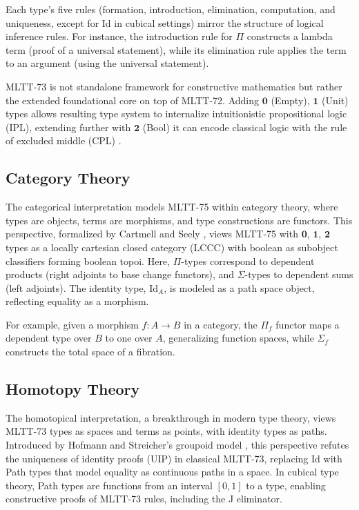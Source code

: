 \documentclass{article}
\begin{document}
Each type’s five rules (formation, introduction, elimination, computation,
and uniqueness, except for Id in cubical settings) mirror the structure
of logical inference rules. For instance, the introduction rule for $\Pi$
constructs a lambda term (proof of a universal statement), while its elimination
rule applies the term to an argument (using the universal statement).

MLTT-73 is not standalone framework for constructive mathematics
but rather the extended foundational core on top of MLTT-72.
Adding $\mathbf{0}$ (Empty), $\mathbf{1}$ (Unit) types allows
resulting type system to internalize intuitionistic propositional logic (IPL),
extending further with $\mathbf{2}$ (Bool) it can encode classical logic with
the rule of excluded middle (CPL) \cite{Nordstrom90}.

\subsection{Category Theory}

The categorical interpretation models MLTT-75 within category theory,
where types are objects, terms are morphisms, and type constructions are functors.
This perspective, formalized by Cartmell and Seely \cite{Jacobs99},
views MLTT-75 with $\mathbf{0}$, $\mathbf{1}$, $\mathbf{2}$ types
as a locally cartesian closed category (LCCC) with boolean as subobject classifiers forming boolean topoi.
Here, $\Pi$-types correspond to dependent products (right adjoints to base change functors),
and $\Sigma$-types to dependent sums (left adjoints).
The identity type, $\text{Id}_A$, is modeled as a path space object, reflecting equality as a morphism.

For example, given a morphism $f : A \to B$ in a category, the $\Pi_f$
functor maps a dependent type over $B$ to one over $A$, generalizing
function spaces, while $\Sigma_f$ constructs the total space of a fibration.

\subsection{Homotopy Theory}

The homotopical interpretation, a breakthrough in modern type theory,
views MLTT-73 types as spaces and terms as points, with identity types as paths.
Introduced by Hofmann and Streicher’s groupoid model \cite{Hofmann96},
this perspective refutes the uniqueness of identity proofs (UIP) in
classical MLTT-73, replacing Id with Path types that model equality
as continuous paths in a space. In cubical type theory, Path types
are functions from an interval $[0,1]$ to a type, enabling constructive
proofs of MLTT-73 rules, including the J eliminator.
\end{document}
